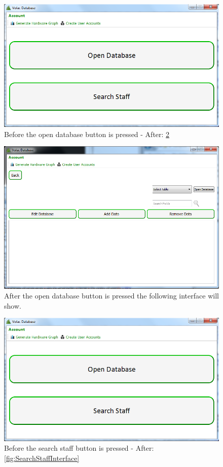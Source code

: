 \begin{figure}[H]
    \includegraphics[width=\textwidth]{./Testing/Images/AdminInterface.png}
    \caption{Before the open database button is pressed - After: \ref{fig:OpenDatabaseInterface}} \label{fig:OpenDatabaseInterfaceBF}
\end{figure}


\begin{figure}[H]
    \includegraphics[width=\textwidth]{./Testing/Images/OpenDatabaseInterface.png}
    \caption{After the open database button is pressed the following interface will show.} \label{fig:OpenDatabaseInterface}
\end{figure}

\begin{figure}[H]
    \includegraphics[width=\textwidth]{./Testing/Images/AdminInterface.png}
    \caption{Before the search staff button is pressed - After:\ref{fig:SearchStaffInterface}} \label{fig:SearchStaffInterfaceBF}
\end{figure}

